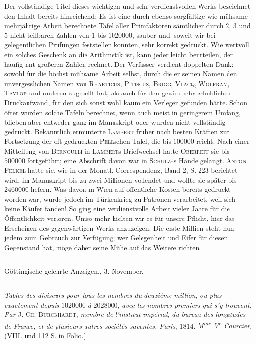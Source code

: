 Der vollständige Titel dieses wichtigen und sehr verdienstvollen Werks bezeichnet den Inhalt bereits hinreichend: Es ist eine durch ebenso sorgfältige wie mühsame mehrjährige Arbeit berechnete Tafel aller Primfaktoren sämtlicher durch $2$, $3$ und $5$ nicht teilbaren Zahlen von $1$ bis $1020000$, sauber und, soweit wir bei gelegentlichen Prüfungen feststellen konnten, sehr korrekt gedruckt. Wie wertvoll ein solches Geschenk an die Arithmetik ist, kann jeder leicht beurteilen, der häufig mit größeren Zahlen rechnet. Der Verfasser verdient doppelten Dank: sowohl für die höchst mühsame Arbeit selbst, durch die er seinen Namen den unvergesslichen Namen von \textsc{Rhaeticus}, \textsc{Pitiscus}, \textsc{Brigg}, \textsc{Vlacq}, \textsc{Wolfram}, \textsc{Taylor} und anderen zugesellt hat, als auch für den gewiss sehr erheblichen Druckaufwand, für den sich sonst wohl kaum ein Verleger gefunden hätte. Schon öfter wurden solche Tafeln berechnet, wenn auch meist in geringerem Umfang, blieben aber entweder ganz im Manuskript oder wurden nicht vollständig gedruckt. Bekanntlich ermunterte \textsc{Lambert} früher nach besten Kräften zur Fortsetzung der oft gedruckten \textsc{Pell}schen Tafel, die bis $100000$ reicht. Nach einer Mitteilung von \textsc{Bernoulli} in \textsc{Lambert}s Briefwechsel hatte \textsc{Oberreit} sie bis $500000$ fortgeführt; eine Abschrift davon war in \textsc{Schulze}s Hände gelangt. \textsc{Anton Felkel} hatte sie, wie in der Monatl. Correspondenz, Band 2, S. 223 berichtet wird, im Manuskript bis zu zwei Millionen vollendet und wollte sie später bis $2460000$ liefern. Was davon in Wien auf öffentliche Kosten bereits gedruckt worden war, wurde jedoch im Türkenkrieg zu Patronen verarbeitet, weil sich keine Käufer fanden! So ging eine verdienstvolle Arbeit vieler Jahre für die Öffentlichkeit verloren. Umso mehr hielten wir es für unsere Pflicht, hier das Erscheinen des gegenwärtigen Werks anzuzeigen. Die erste Million steht nun jedem zum Gebrauch zur Verfügung; wer Gelegenheit und Eifer für diesen Gegenstand hat, möge daher seine Mühe auf das Weitere richten.

\begin{center}
\rule{.86\linewidth}{.3pt}\par
Göttingische gelehrte Anzeigen., 3. November.\par
\rule{.86\linewidth}{.3pt}
\end{center}
\emph{Tables des diviseurs pour tous les nombres du deuxième million, ou plus exactement depuis} $1020000$ \emph{à} $2028000$, \emph{avec les nombres premiers qui s'y trouvent. Par} \textsc{J. Ch. Burckhardt}, \emph{membre de l'institut impérial, du bureau des longitudes de France, et de plusieurs autres sociétés savantes. Paris}, 1814. \emph{M\textsuperscript{me} V\textsuperscript{e} Courcier}. (VIII. und 112 S. in Folio.)

